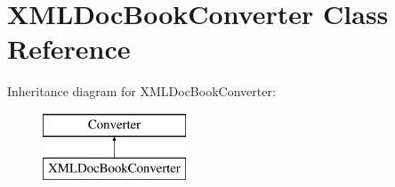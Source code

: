 \hypertarget{class_x_m_l_doc_book_converter}{\section{\-X\-M\-L\-Doc\-Book\-Converter \-Class \-Reference}
\label{class_x_m_l_doc_book_converter}
}
\-Inheritance diagram for \-X\-M\-L\-Doc\-Book\-Converter\-:\begin{figure}[H]
\begin{center}
\leavevmode
\includegraphics[height=2.000000cm]{class_x_m_l_doc_book_converter}
\end{center}
\end{figure}
